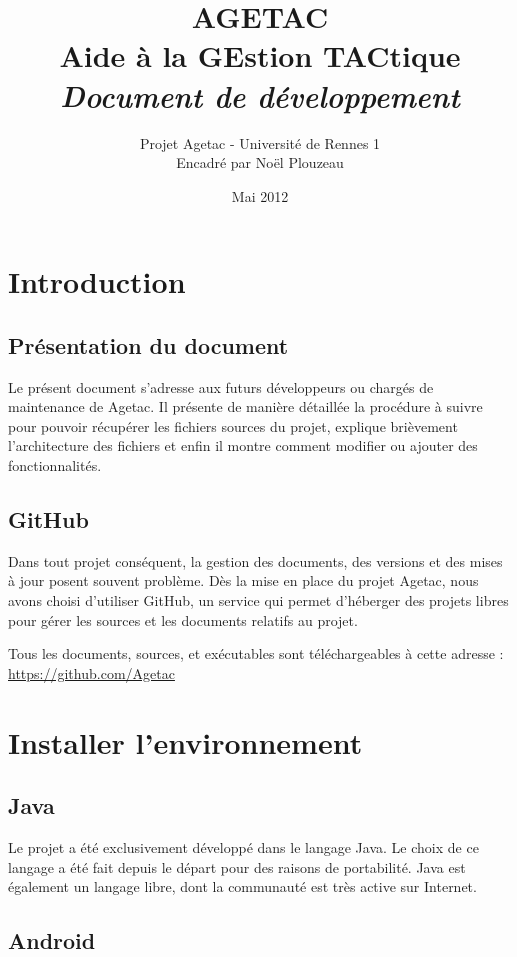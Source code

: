 \documentclass{article}
\title{\Huge{AGETAC\\
Aide à la GEstion TACtique\\}
\huge{{\color{color02} \textit{Document de développement}}}}
\date{Mai 2012}
\author{Projet Agetac - Université de Rennes 1\\
Encadré par Noël Plouzeau}
\begin{document}
\maketitle
\tableofcontents
\newpage


\section{Introduction}

\subsection{Présentation du document}

Le présent document s'adresse aux futurs développeurs ou chargés 
de maintenance de Agetac. Il présente de manière détaillée la procédure à 
suivre pour pouvoir récupérer les fichiers sources du projet, explique brièvement 
l'architecture des fichiers et enfin il montre comment modifier ou ajouter des 
fonctionnalités.

\subsection{GitHub}

Dans tout projet conséquent, la gestion des documents, des versions 
et des mises à jour posent souvent problème. Dès la mise en place 
du projet Agetac, nous avons choisi d'utiliser GitHub, un service qui permet d'héberger 
des projets libres pour gérer les sources et les documents relatifs au projet.

Tous les documents, sources, et exécutables sont téléchargeables 
à cette adresse : \\ \url{https://github.com/Agetac}

\section{Installer l'environnement}


\subsection{Java}

Le projet a été exclusivement développé dans le langage Java. 
Le choix de ce langage a été fait depuis le départ pour des raisons de portabilité. Java 
est également un langage libre, dont la communauté est très active sur Internet.


\subsection{Android}
\end{document}
